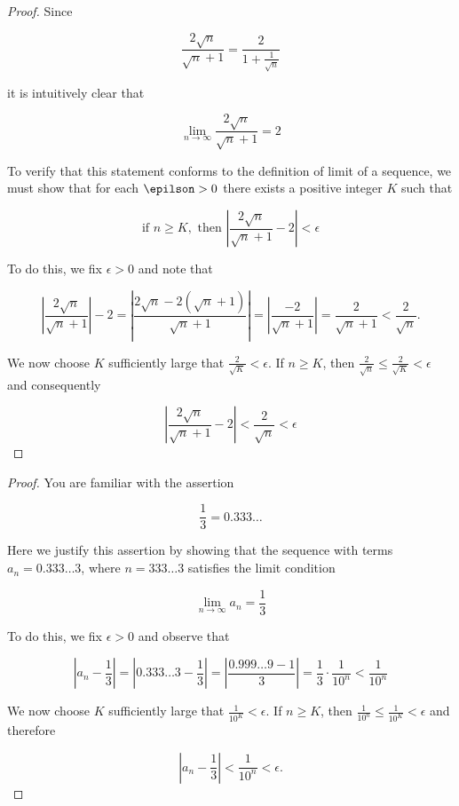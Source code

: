         \textit{}

        \begin{proof}
            Since

            \[
                \frac{2\sqrt{n}}{\sqrt{n} + 1} = \frac{2}{1+\frac{1}{\sqrt{n}}}
            \]

            it is intuitively clear that

            \[
                \lim_{n\to \infty} \frac{2\sqrt{n}}{\sqrt{n} + 1} = 2
            \]

            To verify that this statement conforms to the definition of limit of a sequence, we must show that for each $\epilson > 0$ there exists a positive integer $K$ such that

            \[
                \text{if } n \geq K, \text{ then } \left|\frac{2\sqrt{n}}{\sqrt{n}+1} - 2\right| < \epsilon
            \]

            To do this, we fix $\epsilon > 0$ and note that

            \[
                \left|\frac{2\sqrt{n}}{\sqrt{n} + 1}\right| - 2 = \left|\frac{2\sqrt{n} - 2(\sqrt{n} + 1)}{\sqrt{n} + 1}\right| = \left|\frac{-2}{\sqrt{n} + 1}\right| = \frac{2}{\sqrt{n}+1} < \frac{2}{\sqrt{n}}.
            \]

            We now choose $K$ sufficiently large that $\frac{2}{\sqrt{K}} < \epsilon$. If $n\geq K$, then $\frac{2}{\sqrt{n}} \leq \frac{2}{\sqrt{K}} < \epsilon$ and consequently

            \[
                \left|\frac{2\sqrt{n}}{\sqrt{n} + 1} - 2\right| < \frac{2}{\sqrt{n}} < \epsilon
            \]
        \end{proof}

        \textit{}

        \begin{proof}
            You are familiar with the assertion

            \[
                \frac{1}{3} = 0.333 \dots
            \]

            Here we justify this assertion by showing that the sequence with terms $a_n = 0.333 \dots 3$, where $n = 333\dots 3$ satisfies the limit condition

            \[
                \lim_{n\to\infty} a_n = \frac{1}{3}
            \]

            To do this, we fix $\epsilon > 0$ and observe that

            \[
                \left|a_n - \frac{1}{3}\right| = \left|0.333\dots 3 - \frac{1}{3}\right| = \left|\frac{0.999\dots 9-1}{3}\right| = \frac{1}{3}\cdot\frac{1}{10^n} < \frac{1}{10^n}
            \]

            We now choose $K$ sufficiently large that $\frac{1}{10^K} < \epsilon$. If $n\geq K$, then $\frac{1}{10^n} \leq \frac{1}{10^K} < \epsilon$ and therefore

            \[
                \left|a_n - \frac{1}{3}\right| < \frac{1}{10^n} < \epsilon.
            \]
        \end{proof}


